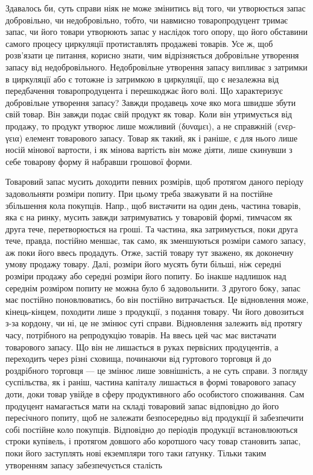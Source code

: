 Здавалось би, суть справи ніяк не може змінитись від того, чи утворюється
запас добровільно, чи недобровільно, тобто, чи навмисно товаропродуцент
тримає запас, чи його товари утворюють запас у наслідок того опору, що його
обставини самого процесу циркуляції протиставлять продажеві товарів. Усе
ж, щоб розв’язати це питання, корисно знати, чим відрізняється добровільне
утворення запасу від недобровільного. Недобровільне утворення запасу
випливає з затримки в циркуляції або є тотожне із затримкою в циркуляції,
що є незалежна від передбачення товаропродуцента і перешкоджає його
волі. Що характеризує добровільне утворення запасу? Завжди продавець
хоче яко мога швидше збути свій товар. Він завжди подає свій продукт як
товар. Коли він утримується від продажу, то продукт утворює лише можливий
(\textgreek{δυναμει}), а не справжній (\textgreek{ενεργεια}) елемент товарового запасу.
Товар як такий, як і раніше, є для нього лише носій мінової вартости,
і як мінова вартість він може діяти, лише скинувши з себе товарову
форму й набравши грошової форми.

Товаровий запас мусить доходити певних розмірів, щоб протягом
даного періоду задовольняти розміри попиту. При цьому треба зважувати
й на постійне збільшення кола покупців. Напр., щоб вистачити на один день,
частина товарів, яка є на ринку, мусить завжди затримуватись у товаровій
формі, тимчасом як друга тече, перетворюється на гроші. Та частина,
яка затримується, поки друга тече, правда, постійно меншає, так само,
як зменшуються розміри самого запасу, аж поки його ввесь продадуть.
Отже, застій товару тут зважено, як доконечну умову продажу
товару. Далі, розміри його мусять бути більші, ніж середні розміри
продажу або середні розміри його попиту. Бо інакше надлишок над
середнім розміром попиту не можна було б задовольнити. З другого боку,
запас має постійно поновлюватись, бо він постійно витрачається. Це
відновлення може, кінець-кінцем, походити лише з продукції, з подання
товару. Чи його довозиться з-за кордону, чи ні, це не змінює суті
справи. Відновлення залежить від протягу часу, потрібного на репродукцію
товарів. На ввесь цей час має вистачати товарового запасу. Що
він не лишається в руках первісних продуцентів, а переходить через різні
сховища, починаючи від гуртового торговця й до роздрібного торговця
— це змінює лише зовнішність, а не суть справи. З погляду суспільства,
як і раніш, частина капіталу лишається в формі товарового запасу доти,
доки товар увійде в сферу продуктивного або особистого споживання. Сам
продуцент намагається мати на складі товаровий запас відповідно до його
пересічного попиту, щоб не залежати безпосередньо від продукції й
забезпечити собі постійне коло покупців. Відповідно до періодів продукції
встановлюються строки купівель, і протягом довшого або коротшого
часу товар становить запас, поки його заступлять нові екземпляри того
таки ґатунку. Тільки таким утворенням запасу забезпечується сталість
\parbreak{}  %
